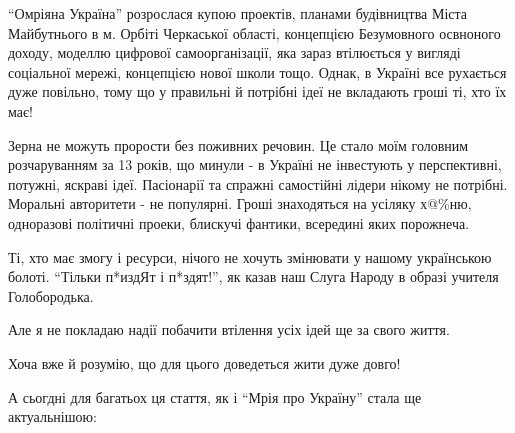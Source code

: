 \enquote{Омріяна Україна} розрослася купою проектів, планами будівництва Міста
Майбутнього в м. Орбіті Черкаської області, концепцією Безумовного освноного
доходу, моделлю цифрової самоорганізації, яка зараз втілюється у вигляді
соціальної мережі, концепцією нової школи тощо. Однак, в Україні все рухається
дуже повільно, тому що у правильні й потрібні ідеї не вкладають гроші ті, хто
їх має! 

Зерна не можуть прорости без поживних речовин. Це стало моїм головним
розчаруванням за 13 років, що минули -  в Україні не інвестують у перспективні,
потужні, яскраві ідеї. Пасіонарії та спражні самостійні лідери нікому не
потрібні. Моральні авторитети - не популярні. Гроші знаходяться на усіляку
х@\%ню, одноразові політичні проеки, блискучі фантики, всередині яких порожнеча. 

Ті, хто має змогу і ресурси, нічого не хочуть змінювати у нашому українською
болоті. \enquote{Тільки п*издЯт і п*здят!}, як казав наш Слуга Народу в образі учителя
Голобородька. 

Але я не покладаю надії побачити втілення усіх ідей ще за свого життя. 

Хоча вже й розумію, що для цього доведеться жити дуже довго!

А сьогдні для багатьох ця стаття, як і \enquote{Мрія про Україну} стала ще
актуальнішою:

